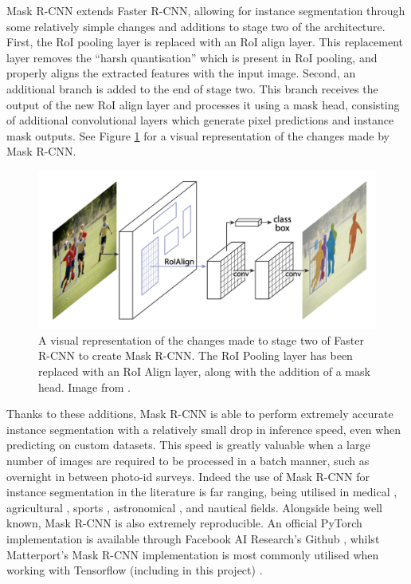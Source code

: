 Mask R-CNN extends Faster R-CNN, allowing for instance segmentation through some relatively simple changes and additions to stage two of the architecture. First, the RoI pooling layer is replaced with an RoI align layer. This replacement layer removes the ``harsh quantisation'' which is present in RoI pooling, and properly aligns the extracted features with the input image. Second, an additional branch is added to the end of stage two. This branch receives the output of the new RoI align layer and processes it using a mask head, consisting of additional convolutional layers which generate pixel predictions and instance mask outputs. See Figure \ref{fig:mask-r-cnn-changes} for a visual representation of the changes made by Mask R-CNN.  

\begin{figure}
	\begin{center}
		\includegraphics[scale=0.3]{Chapter2/figs/mask-r-cnn-changes.png}
	\end{center}
	\caption[A visual representation of the changes made to stage two of Faster R-CNN to create Mask R-CNN.]{A visual representation of the changes made to stage two of Faster R-CNN to create Mask R-CNN. The RoI Pooling layer has been replaced with an RoI Align layer, along with the addition of a mask head. Image from \cite{he_mask_2017}.}
	\label{fig:mask-r-cnn-changes}
\end{figure}

Thanks to these additions, Mask R-CNN is able to perform extremely accurate instance segmentation with a relatively small drop in inference speed, even when predicting on custom datasets. This speed is greatly valuable when a large number of images are required to be processed in a batch manner, such as overnight in between photo-id surveys. Indeed the use of Mask R-CNN for instance segmentation in the literature is far ranging, being utilised in medical \cite{rohit_malhotra_autonomous_2018, chiao_detection_2019, liu_segmentation_2018, anantharaman_utilizing_2018}, agricultural \cite{qiao_cattle_2019, zhao_comparing_2018, lee_potato_2020, chu_deepapple_2020}, sports \cite{buric_ball_2018, pobar_detection_2019, nguyen_hand_2018}, astronomical \cite{burke_deblending_2019}, and nautical \cite{nie_inshore_2018, hong_trashcan_2020} fields. Alongside being well known, Mask R-CNN is also extremely reproducible. An official PyTorch implementation is available through Facebook AI Research's Github \cite{wu_detectron2_2020}, whilst Matterport's Mask R-CNN implementation is most commonly utilised when working with Tensorflow (including in this project) \cite{waleed_mask_2017}.

